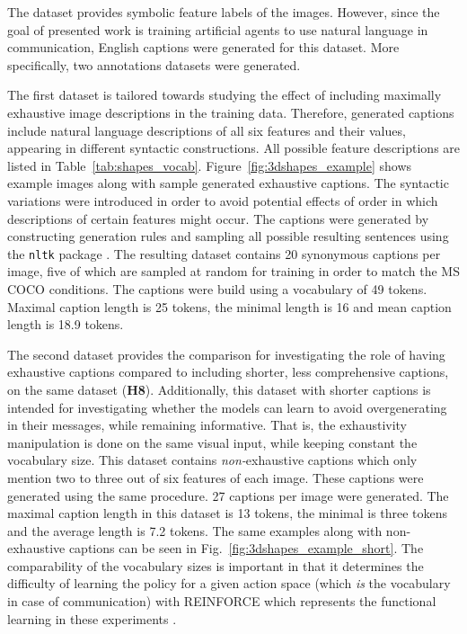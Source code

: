 The dataset provides symbolic feature labels of the images. However, since the goal of presented work is training artificial agents to use natural language in communication, English captions were generated for this dataset. More specifically, two annotations datasets were generated. 

The first dataset is tailored towards studying the effect of including maximally exhaustive image descriptions in the training data. Therefore, generated captions include natural language descriptions of all six features and their values, appearing in different syntactic constructions. All possible feature descriptions are listed in Table~\ref{tab:shapes_vocab}. Figure~\ref{fig:3dshapes_example} shows example images along with sample generated exhaustive captions. The syntactic variations were introduced in order to avoid potential effects of order in which descriptions of certain features might occur.
The captions were generated by constructing generation rules and sampling all possible resulting sentences using the \texttt{nltk} package \parencite{bird2006nltk}. The resulting dataset contains 20 synonymous captions per image, five of which are sampled at random for training in order to match the MS COCO conditions. The captions were build using a vocabulary of 49 tokens. Maximal caption length is 25 tokens, the minimal length is 16 and mean caption length is 18.9 tokens. 

The second dataset provides the comparison for investigating the role of having exhaustive captions compared to including shorter, less comprehensive captions, on the same dataset (\textbf{H8}). Additionally, this dataset with shorter captions is intended for investigating whether the models can learn to avoid overgenerating in their messages, while remaining informative.
That is, the exhaustivity manipulation is done on the same visual input, while keeping constant the vocabulary size. This dataset contains \textit{non-}exhaustive captions which only mention two to three out of six features of each image. These captions were generated using the same procedure. 27 captions per image were generated. The maximal caption length in this dataset is 13 tokens, the minimal is three tokens and the average length is 7.2 tokens.
The same examples along with non-exhaustive captions can be seen in Fig.~\ref{fig:3dshapes_example_short}.
The comparability of the vocabulary sizes is important in that it determines the difficulty of learning the policy for a given action space (which \emph{is} the vocabulary in case of communication) with REINFORCE which represents the functional learning in these experiments \parencite[cf.][]{havrylov2017emergence}.

